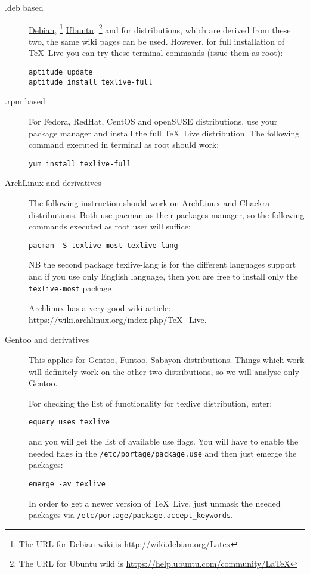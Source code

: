 \begin{description}
    \item[.deb based] 
        \href{http://wiki.debian.org/Latex}{Debian},
        \footnote{The URL for Debian wiki is \url{http://wiki.debian.org/Latex}}
        \href{https://help.ubuntu.com/community/LaTeX}{Ubuntu},
        \footnote{The URL for Ubuntu wiki is
        \url{https://help.ubuntu.com/community/LaTeX}}
        and for distributions, which are derived from these two, the same wiki
        pages can be used. However, for full installation of \TeX\ Live you can try
        these terminal commands (issue them as root):
\begin{lstlisting}
aptitude update
aptitude install texlive-full
\end{lstlisting}

    \item[.rpm based]
        For Fedora, RedHat, CentOS and openSUSE distributions, use your package
        manager and install the full \TeX\ Live distribution. The following
        command executed in terminal as root should work:
\begin{lstlisting}
yum install texlive-full
\end{lstlisting}

    \item[ArchLinux and derivatives]
        The following instruction should work on ArchLinux and Chackra
        distributions. Both use pacman as their packages manager, so the
        following commands executed as root user will suffice:
\begin{lstlisting}
pacman -S texlive-most texlive-lang
\end{lstlisting}
        NB the second package texlive-lang is for the different languages
        support and if you use only English language, then you are free to
        install only the \verb|texlive-most| package

        Archlinux has a very good wiki article:
        \url{https://wiki.archlinux.org/index.php/TeX_Live}.
        
    \item[Gentoo and derivatives]
        This applies for Gentoo, Funtoo, Sabayon distributions. Things which
        work will definitely work on the other two distributions, so we will
        analyse only Gentoo.

        For checking the list of functionality for texlive distribution, enter:
\begin{lstlisting}
equery uses texlive
\end{lstlisting}
        and you will get the list of available use flags.
        You will have to enable the needed flags in the
        \verb|/etc/portage/package.use| and then just emerge the packages:
\begin{lstlisting}
emerge -av texlive
\end{lstlisting}
        In order to get a newer version of \TeX\ Live, just unmask the needed
        packages via \verb|/etc/portage/package.accept_keywords|.


\end{description}
